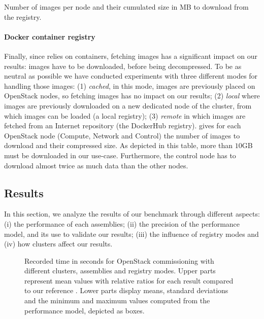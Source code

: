 \begin{table}
  \begin{center}
    
    \caption{Number of \docker images per node and their cumulated size in MB to
      download from the registry.}
    \label{tab:images}
  \end{center}
\end{table}

\paragraph{Docker container registry}
Finally, since \kolla relies on \docker containers, fetching \docker images has a
significant impact on our results: images have to be downloaded, before being
decompressed. To be as neutral as possible we have conducted experiments with
three different modes for handling those images: (1) \emph{cached}, in this mode,
images are previously placed on OpenStack nodes, so fetching \docker images has
no impact on our results; (2) \emph{local} where images are previously
downloaded on a new dedicated node of the cluster, from which images can be
loaded (\ie a local \docker registry); (3) \emph{remote} in which images are
fetched from an Internet repository (\ie the DockerHub registry).
 gives for each OpenStack node (\ie Compute, Network and
Control) the number of \docker images to download and their compressed size.
As depicted in this table, more than $10$GB must be downloaded in our use-case.
Furthermore, the control node has to download almost twice as much data than the
other nodes.

\subsection{Results}

In this section, we analyze the results of our benchmark through
different aspects: (i) the performance of each assemblies; (ii) the
precision of the performance model, and its use to validate our
results; (iii) the influence of registry modes and (iv) how clusters
affect our results.

\begin{figure}[t!]
  \begin{center}
    \def\svgwidth{\columnwidth}
    \def\svgwidth{\columnwidth}
    \caption{Recorded time in seconds for OpenStack commissioning with different
    clusters, assemblies and registry modes. Upper parts represent mean values
    with relative ratios for each result compared to our reference \ansass.
    Lower parts display means, standard deviations and the minimum and maximum
    values computed from the performance model, depicted as boxes.}
    \label{fig:openstack_results}
  \end{center}
\end{figure}

